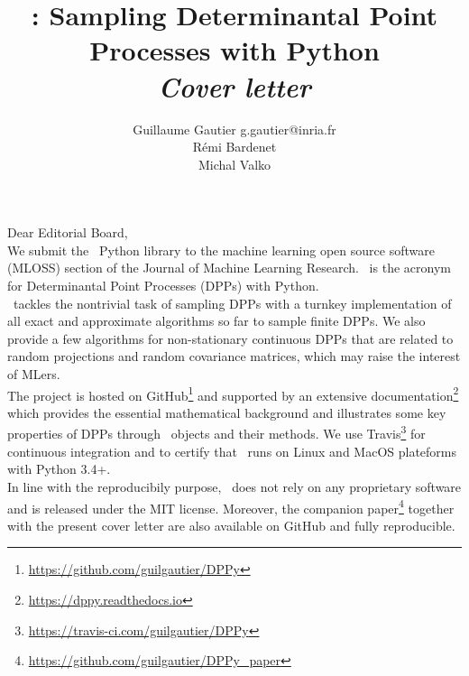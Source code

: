 \documentclass[twoside,11pt]{article}
\begin{document}
\title{\DPPy: Sampling Determinantal Point Processes with Python\\[5pt]
\textit{\normalsize Cover letter}}

\author{\name Guillaume Gautier \email g.gautier@inria.fr \\
       \name R\'emi Bardenet \\
       \name Michal Valko
}


\maketitle

\vspace{2em}

\setcounter{footnote}{3}

Dear Editorial Board,\\

We submit the \DPPy\ Python library to the machine learning open source software (MLOSS) section of the Journal of Machine Learning Research.
\DPPy\ is the acronym for Determinantal Point Processes (DPPs) with Python.\\

\DPPy\ tackles the nontrivial task of sampling DPPs with a turnkey implementation of all exact and approximate algorithms so far to sample finite DPPs.
We also provide a few algorithms for non-stationary continuous DPPs that are related to random projections and random covariance matrices, which may raise the interest of MLers.\\

The project is hosted on GitHub\footnote{\url{https://github.com/guilgautier/DPPy}} and supported by an extensive documentation\footnote{\url{https://dppy.readthedocs.io}} which provides the essential mathematical background and illustrates some key properties of DPPs through \DPPy\ objects and their methods.
We use Travis\footnote{\url{https://travis-ci.com/guilgautier/DPPy}} for continuous integration and to certify that \DPPy\ runs on Linux and MacOS plateforms with Python 3.4+.\\

In line with the reproducibily purpose, \DPPy\ does not rely on any proprietary software and is released under the MIT license.
Moreover, the companion paper\footnote{\url{https://github.com/guilgautier/DPPy_paper}} together with the present cover letter are also available on GitHub and fully reproducible.\\
\end{document}
